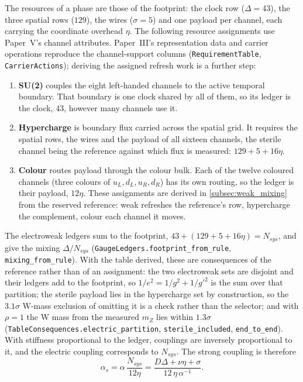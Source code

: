 The resources of a phase are those of the footprint: the clock row ($\Delta=43$), the three spatial rows ($129$), the wires ($\sigma=5$) and one payload per channel, each carrying the coordinate overhead $\eta$. The following resource assignments use Paper~V's channel attributes. Paper~III's representation data and carrier operations reproduce the channel-support columns (\texttt{RequirementTable}, \texttt{CarrierActions}); deriving the assigned refresh work is a further step:
\begin{enumerate}
    \item \textbf{SU(2)} couples the eight left-handed channels to the active temporal boundary. That boundary is one clock shared by all of them, so its ledger is the clock, $43$, however many channels use it.
    \item \textbf{Hypercharge} is boundary flux carried across the spatial grid. It requires the spatial rows, the wires and the payload of all sixteen channels, the sterile channel being the reference against which flux is measured: $129+5+16\eta$.
    \item \textbf{Colour} routes payload through the colour bulk. Each of the twelve coloured channels (three colours of $u_L,d_L,u_R,d_R$) has its own routing, so the ledger is their payload, $12\eta$. These assignments are derived in \cref{subsec:weak_mixing} from the reserved reference: weak refreshes the reference's row, hypercharge the complement, colour each channel it moves.
\end{enumerate}
The electroweak ledgers sum to the footprint, $43+(129+5+16\eta)=N_{sys}$, and give the mixing $\Delta/N_{sys}$ (\texttt{GaugeLedgers.footprint\_from\_rule}, \texttt{mixing\_from\_rule}). With the table derived, these are consequences of the reference rather than of an assignment: the two electroweak sets are disjoint and their ledgers add to the footprint, so $1/e^2=1/g^2+1/g'^2$ is the sum over that partition; the sterile payload lies in the hypercharge set by construction, so the $3.1\sigma$ W-mass exclusion of omitting it is a check rather than the selector; and with $\rho=1$ the W mass from the measured $m_Z$ lies within $1.3\sigma$ (\texttt{TableConsequences.electric\_partition}, \texttt{sterile\_included}, \texttt{end\_to\_end}). With stiffness proportional to the ledger, couplings are inversely proportional to it, and the electric coupling corresponds to $N_{sys}$. The strong coupling is therefore
\begin{equation} \label{eq:alphas_saturation}
\alpha_s = \alpha\,\frac{N_{sys}}{12\eta} = \frac{D\Delta+\nu\eta+\sigma}{12\,\eta\,\alpha^{-1}}.
\end{equation}

